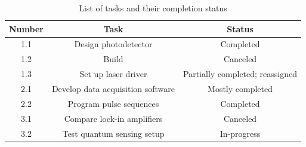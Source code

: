 \begin{table}[!ht]
	\centering
	\begin{tabular}{|c||c|c|}
		\hline
		Number 	& Task 									& Status 							\\
		\hline
		1.1 	& Design photodetector 					& Completed							\\
		\hline
		1.2 	& Build \glsfmtshort{olia} 				& Canceled	 						\\
		\hline
		1.3 	& Set up laser driver					& Partially completed; reassigned	\\
		\hline
		2.1 	& Develop data acquisition software 	& Mostly completed							\\
		\hline
		2.2 	& Program pulse sequences 				& Completed	 	\\
		\hline
		3.1 	& Compare lock-in amplifiers			& Canceled  						\\
		\hline
		3.2 	& Test quantum sensing setup 			& In-progress  						\\
		\hline
	\end{tabular}
	\caption{List of tasks and their completion status}
	\label{tab:test:tasks}
\end{table}


